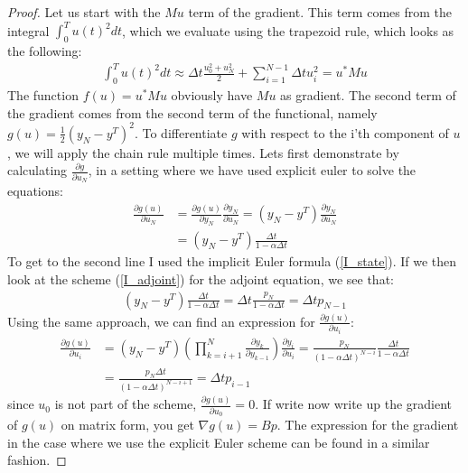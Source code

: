 \documentclass[11pt,a4paper]{article}
\begin{document}
\begin{proof}
Let us start with the $Mu$ term of the gradient. This term comes from the integral $\int_0^T u(t)^2dt$, which we evaluate using the trapezoid rule, which looks as the following:
\begin{align*}
\int_0^T u(t)^2dt \approx \Delta t\frac{u_0^2+u_N^2}{2} + \sum_{i=1}^{N-1} \Delta t u_i^2 = u^*Mu
\end{align*} 
The function $f(u)=u^*Mu$ obviously have $Mu$ as gradient. The second term of the gradient comes from the second term of the functional, namely $g(u)=\frac{1}{2}(y_N -y^T)^2$. To differentiate $g$ with respect to the i'th component of $u$, we will apply the chain rule multiple times. Lets first demonstrate by calculating $\frac{\partial g}{\partial u_N}$, in a setting where we have used explicit euler to solve the equations:
\begin{align*}
\frac{\partial g(u)}{\partial u_N} &= \frac{\partial g(u)}{\partial y_N}\frac{\partial y_N}{\partial u_N} = (y_N -y^T)\frac{\partial y_N}{\partial u_N}\\
&= (y_N -y^T)\frac{\Delta t}{1-\alpha\Delta t}
\end{align*}
To get to the second line I used the implicit Euler formula (\ref{I_state}). If we then look at the scheme (\ref{I_adjoint}) for the adjoint equation, we see that:
\begin{align*}
(y_N -y^T)\frac{\Delta t}{1-\alpha\Delta t} = \Delta t\frac{p_N}{1-\alpha\Delta t} = \Delta t p_{N-1}
\end{align*} 
Using the same approach, we can find an expression for $\frac{\partial g(u)}{\partial u_i}$: 
\begin{align*}
\frac{\partial g(u)}{\partial u_i} &= (y_N -y^T) (\prod_{k=i+1}^{N}\frac{\partial y_{k}}{\partial y_{k-1}}) \frac{\partial y_i}{\partial u_{i}} = \frac{p_N}{(1-\alpha\Delta t)^{N-i}}\frac{\Delta t}{1-\alpha\Delta t} \\
&= \frac{p_N\Delta t}{(1-\alpha\Delta t)^{N-i+1}}=\Delta t p_{i-1}
\end{align*}
since $u_0$ is not part of the scheme, $\frac{\partial g(u)}{\partial u_0}=0$. If write now write up the gradient of $g(u)$ on matrix form, you get $\nabla g(u) = Bp$. The expression for the gradient in the case where we use the explicit Euler scheme can be found in a similar fashion. 
\end{proof}
\end{document}
